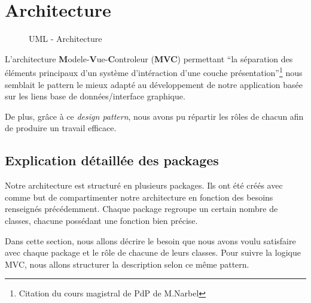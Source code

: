 \chapter{Architecture}
 
\begin{figure}[!h]
\begin{center}
  \caption{UML - Architecture}
  \label{diaglog} 
\end{center}
\end{figure}

L'architecture \textbf{M}odele-\textbf{V}ue-\textbf{C}ontroleur (\textbf{MVC}) permettant ``la séparation des éléments principaux d'un système d'intéraction d'une couche présentation''\footnote{Citation du cours magistral de PdP de M.Narbel} nous semblait le pattern le mieux adapté au développement de notre application basée sur les liens base de données/interface graphique. 

De plus, grâce à ce \textit{design pattern}, nous avons pu répartir les rôles de chacun afin de produire un travail efficace.

\section{Explication détaillée des packages}

Notre architecture est structuré en plusieurs packages. Ils ont été créés avec comme but de compartimenter notre architecture en fonction des besoins renseignés précédemment. Chaque package regroupe un certain nombre de classes, chacune possédant une fonction bien précise.

Dans cette section, nous allons décrire le besoin que nous avons voulu satisfaire avec chaque package et le rôle de chacune de leurs classes. Pour suivre la logique MVC, nous allons structurer la description selon ce même pattern.

